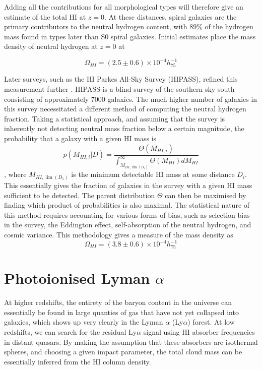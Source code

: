 Adding all the contributions for all morphological types will therefore give an estimate of the total HI at $z=0$. At these distances, spiral galaxies are the primary contributors to the neutral hydrogen content, with $89\%$ of the hydrogen mass found in types later than S0 spiral galaxies. Initial estimates \citep{1993ApJ...419..515R} place the mass density of neutral hydrogen at $z=0$ at 

$$\Omega_{HI} = (2.5 \pm 0.6) \times 10^{-4} h_{75}^{-1} $$

Later surveys, such as the HI Parkes All-Sky Survey (HIPASS), refined this measurement further \citep{2003AJ....125.2842Z}. HIPASS is a blind survey of the southern sky south consisting of approximately 7000 galaxies. The much higher number of galaxies in this survey necessitated a different method of computing the neutral hydrogen fraction. Taking a statistical approach, and assuming that the survey is inherently not detecting neutral mass fraction below a certain magnitude, the probability that a galaxy with a given HI mass is 
$$ p(M_{HI,i}|D) = \frac{\Theta(M_{HI,i})}{\int_{M_{HI,\lim(D_i)}}^\infty \Theta(M_{HI}) dM_{HI}} $$
, where $M_{HI,\lim(D_1)}$ is the minimum detectable HI mass at some distance $D_i$. This essentially gives the fraction of galaxies in the survey with a given HI mass sufficient to be detected. The parent distribution $\Theta$ can then be maximised by finding which product of probabilities is also maximal. The statistical nature of this method requires accounting for various forms of bias, such as selection bias in the survey, the Eddington effect, self-absorption of the neutral hydrogen, and cosmic variance. This methodology gives a measure of the mass density as 
$$\Omega_{HI} = (3.8 \pm 0.6) \times 10^{-4} h_{75}^{-1} $$
\section{Photoionised Lyman $\alpha$}
At higher redshifts, the entirety of the baryon content in the universe can essentially be found in large quanties of gas that have not yet collapsed into galaxies, which shows up very clearly in the Lyman $\alpha$ (Ly$\alpha$) forest. At low redshifts, we can search for the residual Ly$\alpha$ signal using HI absorber frequencies in distant quasars. By making the assumption that these absorbers are isothermal spheres, and choosing a given impact parameter, the total cloud mass can be essentially inferred from the HI column density. 

